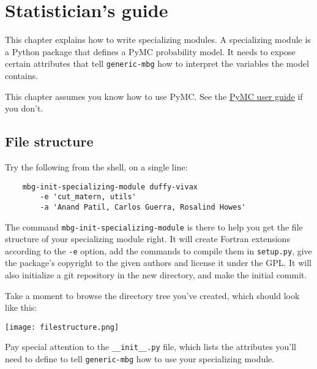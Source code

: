 \chapter{Statistician's guide} 
\label{chap:stat}

This chapter explains how to write specializing modules. A specializing module is a Python package that defines a PyMC probability model. It needs to expose certain attributes that tell \texttt{generic-mbg} how to interpret the variables the model contains.

This chapter assumes you know how to use PyMC. See the \href{http://code.google.com/p/pymc/}{PyMC user guide} if you don't.




\section{File structure} 
Try the following from the shell, on a single line:
\begin{verbatim}
    mbg-init-specializing-module duffy-vivax 
        -e 'cut_matern, utils' 
        -a 'Anand Patil, Carlos Guerra, Rosalind Howes'
\end{verbatim}
The command \texttt{mbg-init-specializing-module} is there to help you get the file structure of your specializing module right. It will create Fortran extensions according to the \texttt{-e} option, add the commands to compile them in \texttt{setup.py}, give the package's copyright to the given authors and license it under the GPL. It will also initialize a git repository in the new directory, and make the initial commit.


Take a moment to browse the directory tree you've created, which should look like this:
\begin{center}
\texttt{[image: filestructure.png]}     
\end{center}
Pay special attention to the \texttt{\_\_init\_\_.py} file, which lists the attributes you'll need to define to tell \texttt{generic-mbg} how to use your specializing module.

